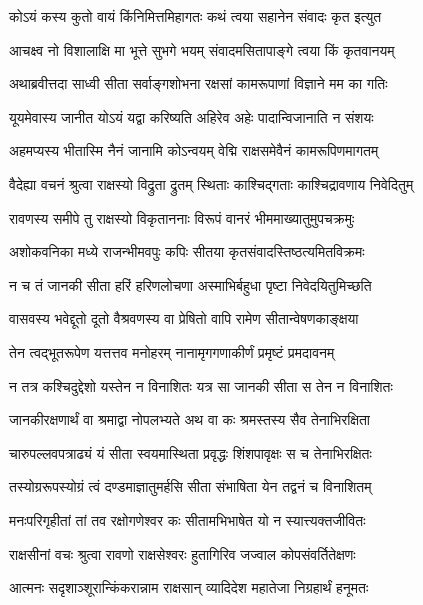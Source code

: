 \twolineshloka
{कोऽयं कस्य कुतो वायं किंनिमित्तमिहागतः}
{कथं त्वया सहानेन संवादः कृत इत्युत} %

\twolineshloka
{आचक्ष्व नो विशालाक्षि मा भूत्ते सुभगे भयम्}
{संवादमसितापाङ्गे त्वया किं कृतवानयम्} %

\twolineshloka
{अथाब्रवीत्तदा साध्वी सीता सर्वाङ्गशोभना}
{रक्षसां कामरूपाणां विज्ञाने मम का गतिः} %

\twolineshloka
{यूयमेवास्य जानीत योऽयं यद्वा करिष्यति}
{अहिरेव अहेः पादान्विजानाति न संशयः} %

\twolineshloka
{अहमप्यस्य भीतास्मि नैनं जानामि कोऽन्वयम्}
{वेद्मि राक्षसमेवैनं कामरूपिणमागतम्} %

\twolineshloka
{वैदेह्या वचनं श्रुत्वा राक्षस्यो विद्रुता द्रुतम्}
{स्थिताः काश्चिद्गताः काश्चिद्रावणाय निवेदितुम्} %

\twolineshloka
{रावणस्य समीपे तु राक्षस्यो विकृताननाः}
{विरूपं वानरं भीममाख्यातुमुपचक्रमुः} %

\twolineshloka
{अशोकवनिका मध्ये राजन्भीमवपुः कपिः}
{सीतया कृतसंवादस्तिष्ठत्यमितविक्रमः} %

\twolineshloka
{न च तं जानकी सीता हरिं हरिणलोचणा}
{अस्माभिर्बहुधा पृष्टा निवेदयितुमिच्छति} %

\twolineshloka
{वासवस्य भवेद्दूतो दूतो वैश्रवणस्य वा}
{प्रेषितो वापि रामेण सीतान्वेषणकाङ्क्षया} %

\twolineshloka
{तेन त्वद्भूतरूपेण यत्तत्तव मनोहरम्}
{नानामृगगणाकीर्णं प्रमृष्टं प्रमदावनम्} %

\twolineshloka
{न तत्र कश्चिदुद्देशो यस्तेन न विनाशितः}
{यत्र सा जानकी सीता स तेन न विनाशितः} %

\twolineshloka
{जानकीरक्षणार्थं वा श्रमाद्वा नोपलभ्यते}
{अथ वा कः श्रमस्तस्य सैव तेनाभिरक्षिता} %

\twolineshloka
{चारुपल्लवपत्राढ्यं यं सीता स्वयमास्थिता}
{प्रवृद्धः शिंशपावृक्षः स च तेनाभिरक्षितः} %

\twolineshloka
{तस्योग्ररूपस्योग्रं त्वं दण्डमाज्ञातुमर्हसि}
{सीता संभाषिता येन तद्वनं च विनाशितम्} %

\twolineshloka
{मनःपरिगृहीतां तां तव रक्षोगणेश्वर}
{कः सीतामभिभाषेत यो न स्यात्त्यक्तजीवितः} %

\twolineshloka
{राक्षसीनां वचः श्रुत्वा रावणो राक्षसेश्वरः}
{हुतागिरिव जज्वाल कोपसंवर्तितेक्षणः} %

\twolineshloka
{आत्मनः सदृशाञ्शूरान्किंकरान्नाम राक्षसान्}
{व्यादिदेश महातेजा निग्रहार्थं हनूमतः} %

